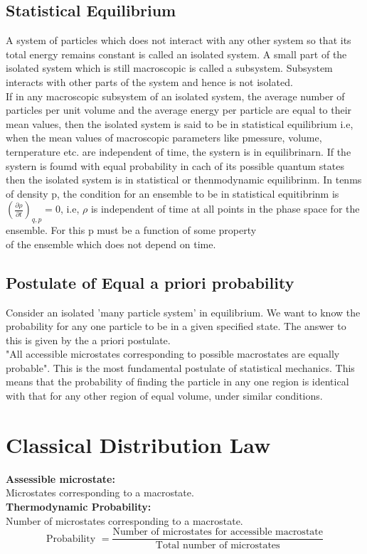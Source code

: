 \subsection{Statistical Equilibrium}
A system of particles which does not interact with any other system so that its total energy remains constant is called an isolated system. A small part of the isolated system which is still macroscopic is called a subsystem. Subsystem interacts with other parts of the system and hence is not isolated.\\
If in any macroscopic subsystem of an isolated system, the average number of particles per unit volume and the average energy per particle are equal to their mean values, then the isolated system is said to be in statistical equilibrium i.e, when the mean values of macroscopic parameters like pmessure, volume, ternperature etc. are independent of time, the systern is in equilibrinarn. If the systern is foumd with equal probability in cach of its possible quantum states then the isolated system is in statistical or thenmodynamic equilibrinm. In tenms of density p, the condition for an ensemble to be in statistical equitibrinm is $\left(\frac{\partial \rho}{\partial t}\right)_{q, p}=0$, i.e, $\rho$ is independent of time at all points in the phase space for the ensemble. For this p must be a function of some property\\
of the ensemble which does not depend on time.
\subsection{Postulate of Equal a priori probability}
Consider an isolated 'many particle system' in equilibrium. We want to know the probability for any one particle to be in a given specified state. The answer to this is given by the a priori postulate.\\
"All accessible microstates corresponding to possible macrostates are equally probable". This is the most fundamental postulate of statistical mechanics. This means that the probability of finding the particle in any one region is identical with that for any other region of equal volume, under similar conditions.
\section{ Classical Distribution Law }
\textbf{Assessible microstate:}\\ Microstates corresponding to a macrostate.\\
\textbf{Thermodynamic Probability:} \\Number of microstates corresponding to a macrostate.\\
$$\text{Probability }=\frac{\text{Number of microstates for accessible macrostate}}{\text{Total number of microstates}}$$
